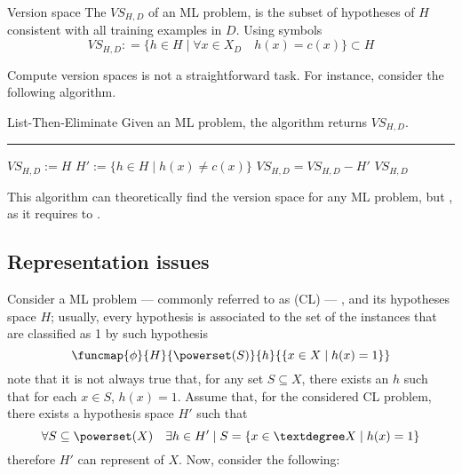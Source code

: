 \documentclass[a4paper, 12pt]{report}
\begin{document}
    \begin{frameddefn}{Version space}
        The  $VS_{H, D}$ of an ML problem, is the subset of hypotheses of $H$ consistent with all training examples in $D$. Using symbols $$VS_{H, D}: = \{h \in H \mid \forall x \in X_D \quad h(x) = c(x)\} \subset H$$
    \end{frameddefn}

    Compute version spaces is not a straightforward task. For instance, consider the following algorithm.

    \begin{framedalgo}[label={lte}]{List-Then-Eliminate}
        Given an ML problem, the algorithm returns $VS_{H, D}$. \\
        \hrule
        \quad
        \begin{algorithmic}[1]
                \State $VS_{H, D} := H$ 
                    \State $H' := \{h \in H \mid h(x) \neq c(x)\}$ 
                    \State $VS_{H, D} = VS_{H, D} - H'$
                \EndFor
                \State {} $VS_{H,D}$
            \EndFunction
        \end{algorithmic}
    \end{framedalgo}

    This algorithm can theoretically find the version space for any ML problem, but , as it requires to .

    \subsection{Representation issues}

    Consider a  ML problem --- commonly referred to as  (CL) --- , and its hypotheses space $H$; usually, every hypothesis is associated to the set of the instances that are classified as 1 by such hypothesis $$\funcmap{\phi}{H}{\powerset(S)}{h}{\{x \in X \mid h(x) = 1\}}$$ note that it is not always true that, for any set $S \subseteq X$, there exists an $h$ such that for each $x \in S$, $h(x) = 1$. Assume that, for the considered CL problem, there exists a hypothesis space $H'$ such that $$\forall S \subseteq \powerset(X) \quad \exists h \in H' \mid S = \{x \in °X \mid h(x)  = 1\}$$ therefore $H'$ can represent  of $X$. Now, consider the following:
\end{document}
